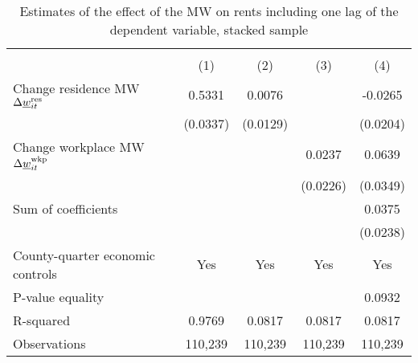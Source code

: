 \begin{table}[hbt!] \centering
    \caption{Estimates of the effect of the MW on rents including one lag of the 
             dependent variable, stacked sample}
    \label{tab:stacked_w6}
    \begin{tabular}{l*{4}{c}}
        \toprule
        & 
            &  \\ \cmidrule(lr){2-2}\cmidrule(lr){3-5}
                                            & (1)   & (2)   & (3)   & (4)            \\ \midrule
        Change residence MW 
                    $\Delta\underline{w}_{it}^{\text{res}}$  &  0.5331  &  0.0076  &       &  -0.0265     \\
                                            & (0.0337) & (0.0129) &       & (0.0204)    \\
        Change workplace MW 
                    $\Delta\underline{w}_{it}^{\text{wkp}}$ &       &       &  0.0237  & 0.0639      \\
                                            &       &       & (0.0226) & (0.0349)    \\ \midrule
        Sum of coefficients                &       &       &       &  0.0375     \\
                                            &       &       &       & (0.0238)    \\ \midrule
        County-quarter economic controls   &  Yes  & Yes   & Yes   & Yes      \\
        P-value equality                   &       &       &       & 0.0932      \\
        R-squared                          &  0.9769  &  0.0817  &  0.0817  & 0.0817      \\
        Observations                       & 110,239  & 110,239  & 110,239  & 110,239     \\\bottomrule
    \end{tabular}


\end{table}

